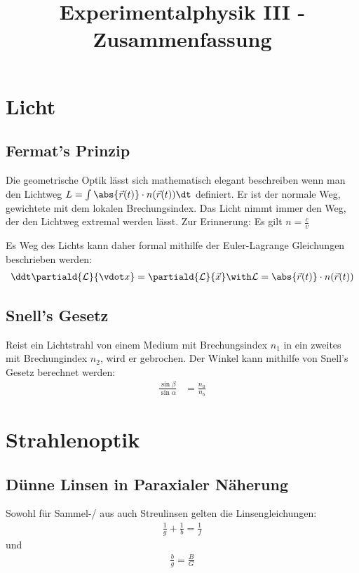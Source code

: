 \documentclass[twocolumn]{summery}
\title{Experimentalphysik III - Zusammenfassung}
\begin{document}
\maketitle
\tableofcontents

\section{Licht}
\subsection{Fermat's Prinzip}
Die geometrische Optik lässt sich mathematisch elegant beschreiben wenn man den Lichtweg 
\(L = \int \abs{\vec r(t)}\cdot n(\vec r (t)) \dt\) definiert. Er ist der normale Weg, gewichtete 
mit dem lokalen Brechungsindex.
Das Licht nimmt immer den Weg, der den Lichtweg extremal werden lässt.
Zur Erinnerung: Es gilt \(n = \frac{c}{v}\)

Es Weg des Lichts kann daher formal mithilfe der Euler-Lagrange Gleichungen beschrieben werden:
\begin{align*}
    \ddt \partiald{\mathcal L}{\vdot x} = \partiald{\mathcal L}{\vec x} \with \mathcal L = \abs{\vec r(t)}\cdot n(\vec r (t))
\end{align*}

\subsection{Snell's Gesetz}
Reist ein Lichtstrahl von einem Medium mit Brechungsindex \(n_1\) in ein zweites mit 
Brechungindex \(n_2\), wird er gebrochen. Der Winkel kann mithilfe von Snell's Gesetz 
berechnet werden:
\begin{align*}
    \frac{\sin\beta}{\sin\alpha} &= \frac{n_a}{n_b}
\end{align*}

\section{Strahlenoptik}
\subsection{Dünne Linsen in Paraxialer Näherung}
Sowohl für Sammel-/ aus auch Streulinsen gelten die Linsengleichungen:
\begin{align*}
    \frac 1g + \frac 1b = \frac 1f
\end{align*}
und 
\begin{align*}
    \frac{b}{g} = \frac BG   
\end{align*}
\end{document}
